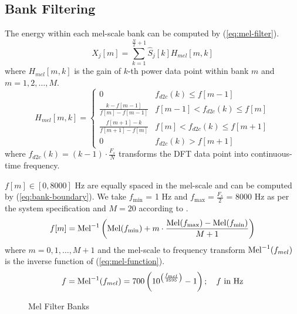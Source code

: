 
\subsection{Bank Filtering}

The energy within each mel-scale bank can be computed by (\ref{eq:mel-filter}).
\begin{equation}
\label{eq:mel-filter}
X_j[m] = \sum^{\frac{N}{2} + 1}_{k=1} \hat{S}_j[k] H_{mel}[m, k]
\end{equation}
where $H_{mel}[m, k]$ is the gain of $k$-th power data point within bank $m$ and $m = 1, 2, \dots, M$.\\

\begin{equation}
\label{eq:mel-bank-gain}
H_{mel}[m, k] =
\begin{cases}
0 &f_{d2c}(k) \le f[m-1]\\
\displaystyle\frac{k - f[m-1]}{f[m] - f[m-1]} &f[m-1] < f_{d2c}(k) \le f[m]\\
\displaystyle\frac{f[m+1] - k}{f[m+1] - f[m]} &f[m] < f_{d2c}(k) \le f[m+1]\\
0 &f_{d2c}(k) > f[m+1]
\end{cases}
\end{equation}
where $f_{d2c}(k) = (k-1) \cdot \frac{F_s}{N}$ transforms the DFT data point into continuous-time frequency.

$f[m] \in [0, 8000]$ Hz are equally spaced in the mel-scale and can be computed by (\ref{eq:bank-boundary}). We take $f_{\min}$ = 1 Hz and $f_{\max} = \frac{F_s}{2}$ = 8000 Hz as per the system specification and $M = 20$ according to \cite{davis1980comparison}.
\begin{equation}
\label{eq:bank-boundary}
f[m] = \operatorname{Mel}^{-1} \left( \operatorname{Mel}(f_{\min}) + m \cdot \frac{\operatorname{Mel}(f_{\max}) - \operatorname{Mel}(f_{\min})}{M + 1} \right)
\end{equation}
where $m = 0, 1, \dots, M+1$ and the mel-scale to frequency transform $\operatorname{Mel}^{-1}(f_{mel})$ is the inverse function of (\ref{eq:mel-function}).
\begin{equation}
\label{eq:mel-function-inverse}
f = \operatorname{Mel}^{-1}(f_{mel}) = 700 \left( 10^{\left(\frac{f_{mel}}{2595}\right)} - 1 \right); \quad f \text{ in Hz}
\end{equation}

\begin{figure}[H]
\centering
{}
\caption{Mel Filter Banks}
\label{mel_triangle}
\end{figure}

